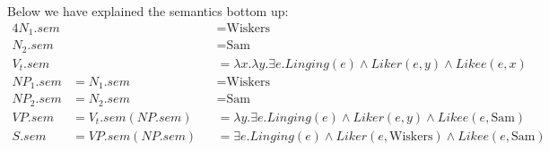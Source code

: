 \documentclass[a4paper]{article}
\begin{document}
    Below we have explained the semantics bottom up:
    \begin{alignat}{4}
        N_1.sem &&&= \text{Wiskers}\\
        N_2.sem &&&= \text{Sam}\\
        V_t.sem &&&= \lambda x.\lambda y.\exists e.Linging(e) \land Liker(e, y) \land Likee(e, x)\\
        NP_1.sem &= N_1.sem &&= \text{Wiskers}\\
        NP_2.sem &= N_2.sem &&= \text{Sam}\\
        VP.sem &= V_t.sem(NP.sem) &&= \lambda y.\exists e.Linging(e) \land Liker(e, y) \land Likee(e, \text{Sam})\\
        S.sem &= VP.sem(NP.sem) &&=\exists e.Linging(e) \land Liker(e,\text{Wiskers}) \land Likee(e, \text{Sam})
    \end{alignat}
\end{document}
